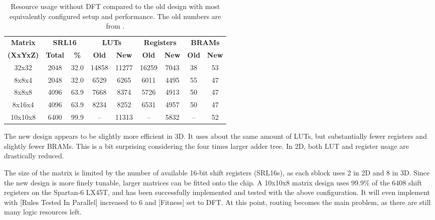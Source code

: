\begin{table}[!ht]
    \renewcommand{\arraystretch}{1.4}
    \centering
    \begin{tabular}{c|c|c|c|c|c|c|c|c}
        \bfseries Matrix & \multicolumn{2}{c|}{\bfseries SRL16} & \multicolumn{2}{c|}{\bfseries LUTs} & \multicolumn{2}{c|}{\bfseries Registers} & \multicolumn{2}{c}{\bfseries BRAMs} \\
        \bfseries (XxYxZ) & \bfseries Total & \bfseries \% & \bfseries Old & \bfseries New & \bfseries Old & \bfseries New & \bfseries Old & \bfseries New \\
        \hline
        32x32 & 2048 & 32.0 & 14858 & 11277 & 16259 & 7043 & 38 & 53 \\
        8x8x4 & 2048 & 32.0 & 6529 & 6265 & 6011 & 4495 & 55 & 47 \\
        8x8x8 & 4096 & 63.9 & 7668 & 8374 & 5726 & 4913 & 50 & 47 \\
        8x16x4 & 4096 & 63.9 & 8234 & 8252 & 6531 & 4957 & 50 & 47 \\
        10x10x8 & 6400 & 99.9 & – & 11313 & – & 5832 & – & 52 \\
    \end{tabular}
    \caption[Resource usage]{
        Resource usage without DFT compared to the old design with most equivalently configured setup and performance.
        The old numbers are from \cite{stovneng2014sblock}.
    }
    \label{tab:resource-usage}
\end{table}

The new design appears to be slightly more efficient in 3D.
It uses about the same amount of LUTs, but substantially fewer registers and slightly fewer BRAMs.
This is a bit surprising considering the four times larger adder tree.
In 2D, both LUT and register usage are drastically reduced.

The size of the matrix is limited by the number of available 16-bit shift registers (SRL16s), as each sblock uses 2 in 2D and 8 in 3D.
Since the new design is more finely tunable, larger matrices can be fitted onto the chip.
A 10x10x8 matrix design uses 99.9\% of the 6408 shift registers on the Spartan-6 LX45T, and has been successfully implemented and tested with the above configuration.
It will even implement with [Rules Tested In Parallel] increased to 6 and [Fitness] set to DFT.
At this point, routing becomes the main problem, as there are still many logic resources left.


